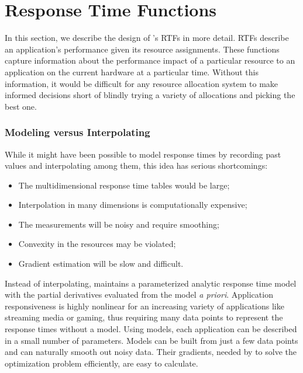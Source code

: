 \section{Response Time Functions}\label{RTFs}


In this section, we describe the design of \pacora's RTFs in more detail.
RTFs describe an application's performance given its resource assignments.  These functions capture information about the performance impact of a particular resource to an application on the current hardware at a particular time. Without this information, it would be difficult for any resource allocation system to make informed decisions short of blindly trying a variety of allocations and picking the best one.

\subsubsection*{Modeling versus Interpolating} While it might have been possible to model response times by recording past values and interpolating among them, this idea has serious shortcomings:
\begin{itemize}
\item The multidimensional response time tables would be large;
\item Interpolation in many dimensions is computationally expensive;
\item The measurements will be noisy and require smoothing;
\item Convexity in the resources may be violated;
\item Gradient estimation will be slow and difficult.
\end{itemize}

Instead of interpolating, \pacora maintains a parameterized analytic response time model with the partial derivatives evaluated from the model \emph{a priori}. Application responsiveness is highly nonlinear for an increasing variety of applications like streaming media or gaming, thus requiring many data points to represent the response times without a model. Using models, each application can be described in a small number of parameters.  Models can be built from just a few data points and can naturally smooth out noisy data. Their gradients, needed by \pacora to solve the optimization problem efficiently, are easy to calculate.

